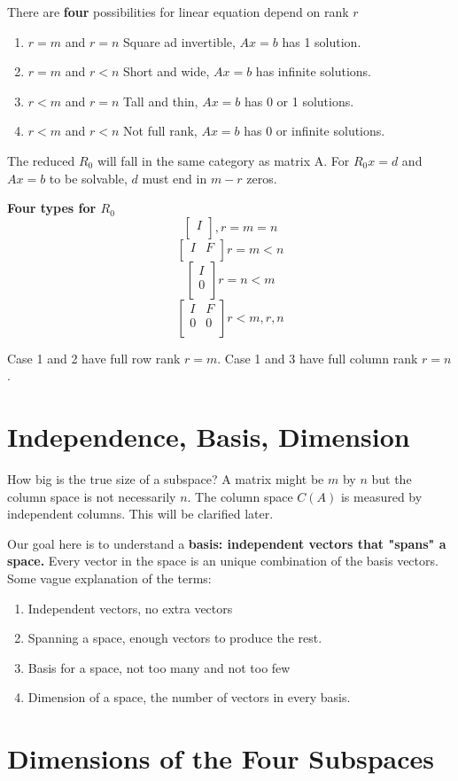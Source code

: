 There are \textbf{four} possibilities for linear equation depend on rank \(r\)
\begin{enumerate}
    \item \(r = m\) and \(r = n\) Square ad invertible, \(Ax = b\) has 1 solution. 
    \item \(r = m\) and \(r < n\) Short and wide, \(Ax = b\) has infinite solutions.    
    \item \(r < m\) and \(r = n\) Tall and thin, \(Ax = b\) has 0 or 1 solutions. 
    \item \(r < m\) and \(r < n\) Not full rank, \(Ax = b\) has 0 or infinite solutions.        
\end{enumerate} 

The reduced \(R_0\) will fall in the same category as matrix A. For \(R_{0}x = d\) and \(Ax = b\) to be solvable, \(d\) must end in \( m - r\) zeros. 

\textbf{Four types for \(R_0\) }
\[
    \begin{bmatrix}
         I \\
    \end{bmatrix}
    , r = m = n
\] 
\[
    \begin{bmatrix}
        I & F  \\
    \end{bmatrix}
    r = m < n 
\]
\[
    \begin{bmatrix}
         I \\
         0 \\
    \end{bmatrix}
    r = n < m
\]
\[
    \begin{bmatrix}
        I & F  \\
        0 & 0  \\
    \end{bmatrix}
    r < m, r , n
\]

Case 1 and 2 have full row rank \(r = m\). Case 1 and 3 have full column rank \(r = n\).  

\section{Independence, Basis, Dimension}

How big is the true size of a subspace? A matrix might be \(m\) by \(n\) but the column space is not necessarily \(n\). The column space \(C(A)\) is measured by independent columns. This will be clarified later. 

Our goal here is to understand a \textbf{basis: independent vectors that "spans" a space.} Every vector in the space is an unique combination of the basis vectors. 
Some vague explanation of the terms:
\begin{enumerate}
    \item Independent vectors, no extra vectors 
    \item Spanning a space, enough vectors to produce the rest. 
    \item Basis for a space, not too many and not too few 
    \item Dimension of a space, the number of vectors in every basis. 
\end{enumerate}

\section{Dimensions of the Four Subspaces}

